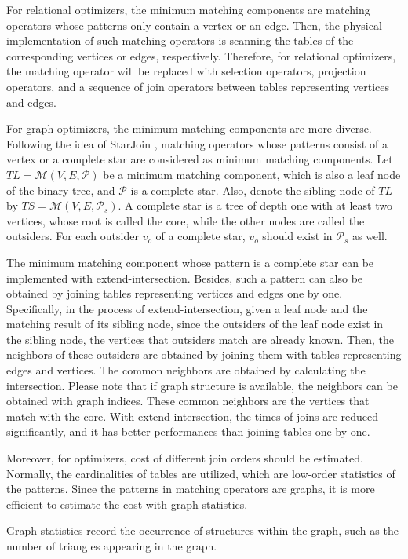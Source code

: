 For relational optimizers, the minimum matching components are matching operators whose patterns only contain a vertex or an edge.
Then, the physical implementation of such matching operators is scanning the tables of the corresponding vertices or edges, respectively.
Therefore, for relational optimizers, the matching operator will be replaced with selection operators, projection operators, and a sequence of join operators between tables representing vertices and edges.

For graph optimizers, the minimum matching components are more diverse.
Following the idea of StarJoin \cite{}, matching operators whose patterns consist of a vertex or a complete star are considered as minimum matching components.
Let $TL = \mathcal{M}(V, E, \mathcal{P})$ be a minimum matching component, which is also a leaf node of the binary tree, and $\mathcal{P}$ is a complete star.
Also, denote the sibling node of $TL$ by $TS = \mathcal{M}(V, E, \mathcal{P}_s)$.
A complete star is a tree of depth one with at least two vertices, whose  root is called the core, while the other nodes are called the outsiders.
For each outsider $v_o$ of a complete star, $v_o$ should exist in $\mathcal{P}_s$ as well.

The minimum matching component whose pattern is a complete star can be implemented with extend-intersection.
Besides, such a pattern can also be obtained by joining tables representing vertices and edges one by one.
Specifically, in the process of extend-intersection, given a leaf node and the matching result of its sibling node, since the outsiders of the leaf node exist in the sibling node, the vertices that outsiders match are already known.
Then, the neighbors of these outsiders are obtained by joining them with tables representing edges and vertices.
The common neighbors are obtained by calculating the intersection.
Please note that if graph structure is available, the neighbors can be obtained with graph indices.
These common neighbors are the vertices that match with the core.
With extend-intersection, the times of joins are reduced significantly, and it has better performances than joining tables one by one.


Moreover, for optimizers, cost of different join orders should be estimated.
Normally, the cardinalities of tables are utilized, which are low-order statistics of the patterns.
Since the patterns in matching operators are graphs, it is more efficient to estimate the cost with graph statistics.

\begin{definition}
    Graph statistics record the occurrence of structures within the graph, such as the number of triangles appearing in the graph.
\end{definition}

